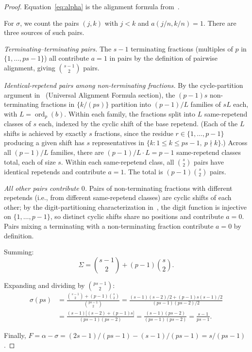 \documentclass[12pt]{amsart}
\theoremstyle{definition}
\theoremstyle{remark}
\begin{document}
\begin{proof}
Equation~\eqref{eq:alpha} is the alignment formula from~\cite{paper2}.

For $\sigma$, we count the pairs $(j,k)$ with $j < k$ and
$a(j/n, k/n) = 1$. There are three sources of such pairs.

\smallskip
\emph{Terminating--terminating pairs.}\quad
The $s - 1$ terminating fractions (multiples of $p$ in
$\{1, \ldots, ps{-}1\}$) all contribute $a = 1$ in pairs by the
definition of pairwise alignment, giving $\binom{s-1}{2}$ pairs.

\smallskip
\emph{Identical-repetend pairs among non-terminating fractions.}\quad
By the cycle-partition argument in~\cite{paper2}
(Universal Alignment Formula section),
the $(p-1)s$ non-terminating fractions in $\{k/(ps)\}$ partition
into $(p-1)/L$ families of $sL$ each, with $L = \operatorname{ord}_p(b)$.
Within each family, the fractions split into $L$ same-repetend
classes of $s$ each, indexed by the cyclic shift of the base
repetend. (Each of the $L$ shifts is achieved by exactly $s$
fractions, since the residue $r \in \{1, \ldots, p{-}1\}$
producing a given shift has $s$ representatives in
$\{k : 1 \le k \le ps{-}1,\ p \nmid k\}$.) Across all
$(p-1)/L$ families, there are $(p-1)/L \cdot L = p - 1$
same-repetend classes total, each of size $s$. Within each
same-repetend class, all $\binom{s}{2}$ pairs have identical
repetends and contribute $a = 1$. The total is
$(p-1)\binom{s}{2}$ pairs.

\smallskip
\emph{All other pairs contribute $0$.}\quad
Pairs of non-terminating fractions with different repetends
(i.e., from different same-repetend classes) are cyclic shifts
of each other; by the digit-partitioning characterization
in~\cite{paper2}, the digit function is injective on
$\{1, \ldots, p{-}1\}$, so distinct cyclic shifts share no
positions and contribute $a = 0$. Pairs mixing a terminating
with a non-terminating fraction contribute $a = 0$ by definition.

\smallskip
Summing:
\[
\Sigma = \binom{s-1}{2} + (p-1)\binom{s}{2}.
\]

Expanding and dividing by $\binom{ps-1}{2}$:
\begin{align*}
\sigma(ps)
&= \frac{\binom{s-1}{2} + (p-1)\binom{s}{2}}{\binom{ps-1}{2}}
= \frac{(s-1)(s-2)/2 + (p-1)s(s-1)/2}{(ps-1)(ps-2)/2} \\
&= \frac{(s-1)\bigl[(s-2) + (p-1)s\bigr]}{(ps-1)(ps-2)}
= \frac{(s-1)(ps - 2)}{(ps-1)(ps-2)}
= \frac{s-1}{ps-1}.
\end{align*}

Finally, $F = \alpha - \sigma = (2s{-}1)/(ps{-}1) - (s{-}1)/(ps{-}1)
= s/(ps{-}1)$.
\end{proof}
\end{document}
